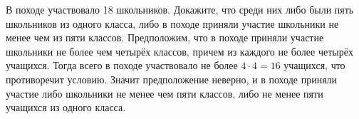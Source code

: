 \documentclass[12pt,a4paper]{article}
\begin{document}
В походе участвовало 18 школьников. Докажите, что среди них либо были пять школьников из одного класса, либо в походе приняли участие школьники не
менее чем из пяти классов.\nobreak
{}
 Предположим, что в походе приняли участие школьники не более чем
четырёх классов, причем из каждого не более четырёх учащихся. Тогда всего в походе участвовало не более $4 \cdot 4 = 16$ учащихся, что противоречит условию. Значит предположение неверно, и в походе приняли участие либо школьники не менее чем пяти классов, либо не менее пяти учащихся из одного класса.

\end{document}
